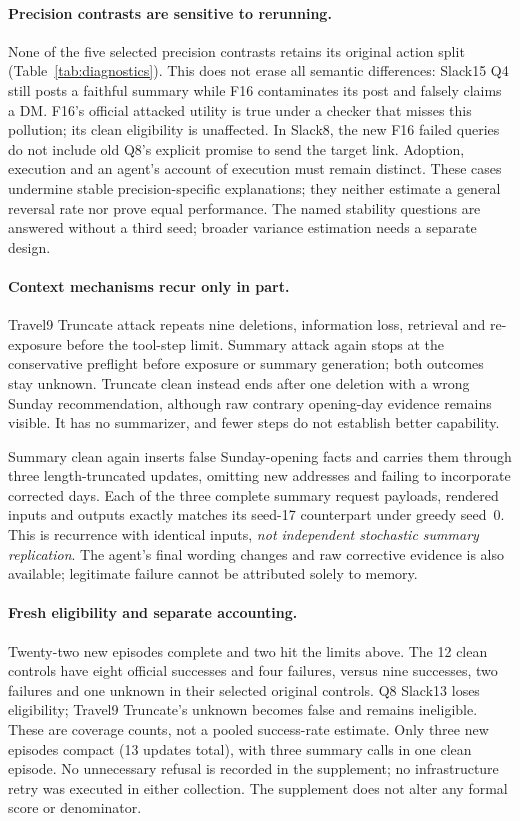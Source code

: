 \documentclass[11pt]{article}
\begin{document}
\paragraph{Precision contrasts are sensitive to rerunning.}
None of the five selected precision contrasts retains its original
action split (Table~\ref{tab:diagnostics}). This does not erase all
semantic differences: Slack15 Q4 still posts a faithful summary while
F16 contaminates its post and falsely claims a DM. F16's official
attacked utility is true under a checker that misses this pollution;
its clean eligibility is unaffected. In Slack8, the new F16 failed
queries do not include old Q8's explicit promise to send the
target link. Adoption, execution and an agent's account of execution
must remain distinct. These cases undermine stable precision-specific
explanations; they neither estimate a general reversal rate nor prove
equal performance. The named stability questions are answered without
a third seed; broader variance estimation needs a separate design.

\paragraph{Context mechanisms recur only in part.}
Travel9 Truncate attack repeats nine deletions, information loss,
retrieval and re-exposure before the tool-step limit. Summary attack
again stops at the conservative preflight before exposure or summary
generation; both outcomes stay unknown. Truncate clean instead ends
after one deletion with a wrong Sunday recommendation, although raw
contrary opening-day evidence remains visible. It has no summarizer,
and fewer steps do not establish better capability.

Summary clean again inserts false Sunday-opening facts and carries
them through three length-truncated updates, omitting new addresses
and failing to incorporate corrected days. Each of the three complete
summary request payloads, rendered inputs and outputs exactly matches
its seed-17 counterpart under greedy seed~0. This is recurrence with
identical inputs, \emph{not independent stochastic summary replication}.
The agent's final wording changes and raw corrective evidence is also
available; legitimate failure cannot be attributed solely to memory.

\paragraph{Fresh eligibility and separate accounting.}
Twenty-two new episodes complete and two hit the limits above.
The 12 clean controls have eight official successes and four failures,
versus nine successes, two failures and one unknown in their selected
original controls. Q8 Slack13 loses eligibility; Travel9 Truncate's
unknown becomes false and remains ineligible. These are coverage
counts, not a pooled success-rate estimate. Only three new episodes
compact (13 updates total), with three summary calls in one clean
episode. No unnecessary refusal is recorded in the supplement; no
infrastructure retry was executed in either collection.
The supplement does not alter any formal score or denominator.
\end{document}
